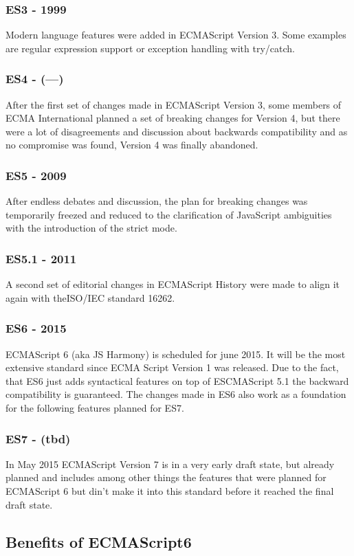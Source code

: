 \documentclass{bioinfo}
\begin{document}
\subsubsection*{\textbf{ES3 - 1999}}
Modern language features were added in ECMAScript Version 3. Some examples are regular expression support or exception handling with try/catch.
\subsubsection*{\textbf{ES4 - (---)}}After the first set of changes made in ECMAScript Version 3, some members of ECMA International planned a set of breaking changes for Version 4, but there were a lot of disagreements and discussion about backwards compatibility and as no compromise was found, Version 4 was finally abandoned. 
\subsubsection*{\textbf{ES5 - 2009}}
After endless debates and discussion, the plan for breaking changes was temporarily freezed and reduced to the clarification of JavaScript ambiguities with the introduction of the strict mode. 
\subsubsection*{\textbf{ES5.1 - 2011}}
A second set of editorial changes in ECMAScript History were made to align it again with theISO/IEC standard 16262.
\subsubsection*{\textbf{ES6 - 2015}}
ECMAScript 6 (aka JS Harmony) is scheduled for june 2015. It will be the most extensive standard since ECMA Script Version 1 was released. Due to the fact, that ES6 just adds syntactical features on top of ESCMAScript 5.1 the backward compatibility is guaranteed. The changes made in ES6 also work as a foundation for the following features planned for ES7.
\subsubsection*{\textbf{ES7 - (tbd)}}
In May 2015 ECMAScript Version 7 is in a very early draft state, but already planned and includes among other things the features that were planned for ECMAScript 6 but
din't make it into this standard before it reached the final draft state. 

\subsection{Benefits of ECMAScript6}
\end{document}
